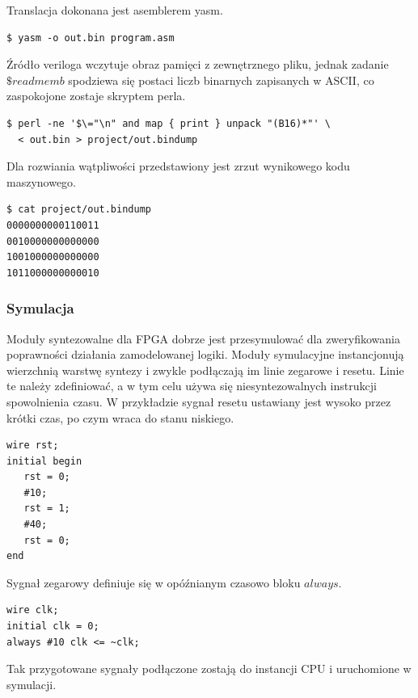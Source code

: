 \documentclass[a4paper,12pt]{article}
\begin{document}
Translacja dokonana jest asemblerem yasm.
\begin{lstlisting}[label=translacja,caption=Translacja]
$ yasm -o out.bin program.asm
\end{lstlisting}

Źródło veriloga wczytuje obraz pamięci z zewnętrznego pliku, jednak zadanie $\$readmemb$ spodziewa się postaci liczb binarnych zapisanych w ASCII, co zaspokojone zostaje skryptem perla.

\begin{lstlisting}[label=translacja,caption=Translacja]
$ perl -ne '$\="\n" and map { print } unpack "(B16)*"' \
  < out.bin > project/out.bindump
\end{lstlisting}

Dla rozwiania wątpliwości przedstawiony jest zrzut wynikowego kodu maszynowego.
\begin{lstlisting}[label=translacja,caption=Translacja]
$ cat project/out.bindump
0000000000110011
0010000000000000
1001000000000000
1011000000000010
\end{lstlisting}



\subsubsection{Symulacja}


Moduły syntezowalne dla FPGA dobrze jest przesymulować dla zweryfikowania poprawności działania zamodelowanej logiki. Moduły symulacyjne instancjonują wierzchnią warstwę syntezy i zwykle podłączają im linie zegarowe i resetu. Linie te należy zdefiniować, a w tym celu używa się niesyntezowalnych instrukcji spowolnienia czasu. W przykładzie sygnał resetu ustawiany jest wysoko przez krótki czas, po czym wraca do stanu niskiego.
\begin{lstlisting}[label=reset,caption=Reset]
wire rst;
initial begin
   rst = 0;
   #10;
   rst = 1;
   #40;
   rst = 0;
end
\end{lstlisting}

Sygnał zegarowy definiuje się w opóźnianym czasowo bloku $always$.
\begin{lstlisting}[label=clk,caption=Clk]
wire clk;
initial clk = 0;
always #10 clk <= ~clk;
\end{lstlisting}

Tak przygotowane sygnały podłączone zostają do instancji CPU i uruchomione w symulacji.
\end{document}
